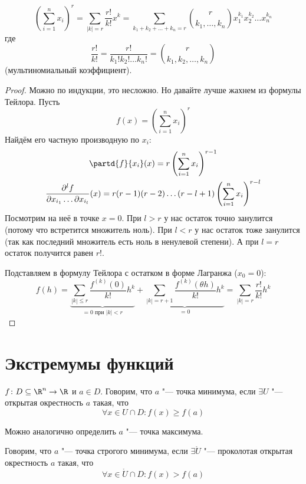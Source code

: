 \begin{theorem}
	\[
		\left(\sum_{i=1}^n x_i\right)^r = \sum_{|k|=r} \frac{r!}{k!} x^k = \sum_{k_1+k_2+\dots+k_n=r}\binom{r}{k_1, \dots, k_n}
			x_1^{k_1}x_2^{k_2}\dots x_n^{k_n}
	\]
	где
	\[ \frac{r!}{k!} = \frac{r!}{k_1!k_2!\dots k_n!} = \binom{r}{k_1, k_2, \dots, k_n}\]
	(мультиномиальный коэффициент).
\end{theorem}
\begin{proof}
	Можно по индукции, это несложно.
	Но давайте лучше жахнем из формулы Тейлора.
	Пусть
	\[ f(x)=\left( \sum_{i=1}^n x_i \right)^r \]
	Найдём его частную производную по $x_i$:
	\begin{gather*}
		\partd{f}{x_i} (x) = r \left( \sum_{i=1}^n x_i \right)^{r-1} \\
		\frac{\partial ^ l f}{\partial x_{i_1} \dots \partial x_{i_l}} (x) = r(r-1)(r-2)\dots(r-l+1) \left( \sum_{i=1}^n x_i \right)^{r-l} \\
	\end{gather*}
	Посмотрим на неё в точке $x=0$.
	При $l>r$ у нас остаток точно занулится (потому что встретится множитель ноль).
	При $l<r$ у нас остаток тоже занулится (так как последний множитель есть ноль в ненулевой степени).
	А при $l=r$ остаток получится равен $r!$.

	Подставляем в формулу Тейлора с остатком в форме Лагранжа ($x_0=0$):
	\[
		f(h)
			= \underbrace{\sum_{|k| \le r} \frac{f^{(k)}(0)}{k!} h^k}_{=0\text{~при~}|k|<r}
			+ \underbrace{\sum_{|k|=r+1} \frac{f^{(k)}(\theta h)}{k!} h^k}_{=0}
			= \sum_{|k|=r} \frac{r!}{k!} h^k
	\]
\end{proof}

\section{Экстремумы функций}
\begin{Def}
	$f \colon D \subseteq \R^n \to \R$ и $a \in D$.
	Говорим, что $a$ "--- точка минимума, если $\exists U$ "--- открытая окрестность $a$ такая, что
	\[ \forall x \in U \cap D \colon f(x) \ge f(a) \]
\end{Def}
\begin{Rem}
	Можно аналогично определить $a$ "--- точка максимума.
\end{Rem}
\begin{Def}
	Говорим, что $a$ "--- точка строгого минимума, если $\exists \mathring U$ "--- проколотая открытая окрестность $a$ такая, что
	\[ \forall x \in \mathring U \cap D \colon f(x) > f(a) \]
\end{Def}

